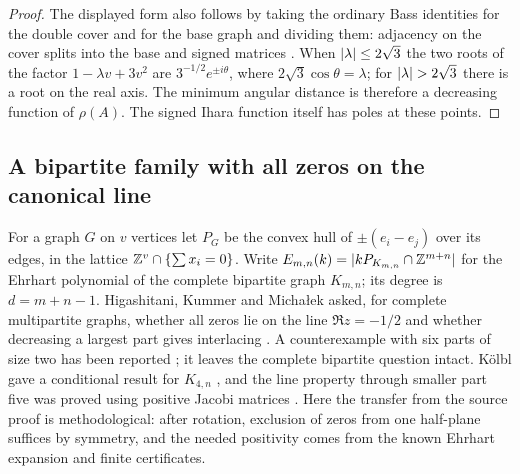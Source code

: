 
\begin{proof}
The displayed form also follows by taking the ordinary Bass identities for
the double cover and for the base graph and dividing them: adjacency on
the cover splits into the base and signed matrices
\cite{Suvagiya2026Parity,Bass1992Ihara}. When
$\lvert\lambda\rvert\le2\sqrt3$ the two roots of the factor
$1-\lambda v+3v^2$ are $3^{-1/2}e^{\pm i\theta}$, where
$2\sqrt3\cos\theta=\lambda$; for $\lvert\lambda\rvert>2\sqrt3$ there is a root on
the real axis. The minimum angular distance is therefore a decreasing
function of $\rho(A)$. The signed Ihara function itself has poles at
these points.
\end{proof}

\subsection{A bipartite family with all zeros on the canonical line}\label{gra:sec:ehrhart}

For a graph $G$ on $v$ vertices let $P_G$ be the convex hull of
$\pm(e_i-e_j)$ over its edges, in the lattice
$\mathbb{Z}^v\cap\{\sum x_i=0\}$. Write
$E_{m,n}(k)=\lvert kP_{K_{m,n}}\cap\mathbb{Z}^{m+n}\rvert$ for the Ehrhart polynomial of
the complete bipartite graph $K_{m,n}$; its degree is $d=m+n-1$.
Higashitani, Kummer and Micha\l{}ek asked, for complete multipartite
graphs, whether all zeros lie on the line $\Re z=-1/2$ and whether
decreasing a largest part gives interlacing
\cite[Conjecture~4.10]{HigashitaniKummerMichalek2016Conjecture}. A
counterexample with six parts of size two has been reported
\cite{DavisCounterexampleEhrhart}; it leaves the complete bipartite question intact.
K\"olbl gave a conditional result for $K_{4,n}$
\cite[Theorem~3.3]{Kolbl2024Ehrhart}, and the line property through
smaller part five was proved using positive Jacobi matrices
\cite{Carptopus2026Ehrhart}. Here the transfer from the source proof is
methodological: after rotation, exclusion of zeros from one half-plane
suffices by symmetry, and the needed positivity comes from the known
Ehrhart expansion and finite certificates.

